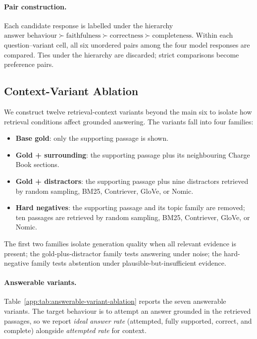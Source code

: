 \documentclass{article}
\theoremstyle{plain}
\theoremstyle{definition}
\theoremstyle{remark}
\begin{document}
\paragraph{Pair construction.}
Each candidate response is labelled under the hierarchy $\text{answer behaviour} \succ \text{faithfulness} \succ \text{correctness} \succ \text{completeness}$.  Within each question--variant cell, all six unordered pairs among the four model responses are compared.  Ties under the hierarchy are discarded; strict comparisons become preference pairs.

\subsection{Context-Variant Ablation}
\label{app:distractor}

We construct twelve retrieval-context variants beyond the main six to isolate how retrieval conditions affect grounded answering. The variants fall into four families:
\begin{itemize}
    \item \textbf{Base gold}: only the supporting passage is shown.
    \item \textbf{Gold + surrounding}: the supporting passage plus its neighbouring Charge Book sections.
    \item \textbf{Gold + distractors}: the supporting passage plus nine distractors retrieved by random sampling, BM25, Contriever, GloVe, or Nomic.
    \item \textbf{Hard negatives}: the supporting passage and its topic family are removed; ten passages are retrieved by random sampling, BM25, Contriever, GloVe, or Nomic.
\end{itemize}
The first two families isolate generation quality when all relevant evidence is present; the gold-plus-distractor family tests answering under noise; the hard-negative family tests abstention under plausible-but-insufficient evidence.

\paragraph{Answerable variants.} Table~\ref{app:tab:answerable-variant-ablation} reports the seven answerable variants. The target behaviour is to attempt an answer grounded in the retrieved passages, so we report \emph{ideal answer rate} (attempted, fully supported, correct, and complete) alongside \emph{attempted rate} for context.
\end{document}
